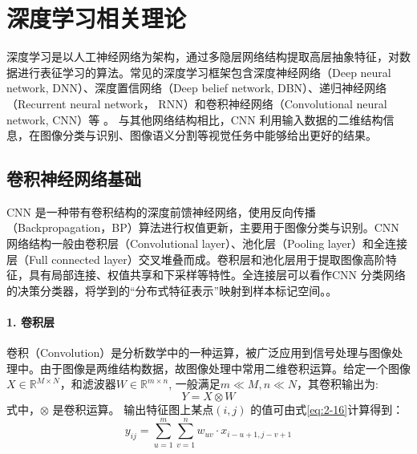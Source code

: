 
\chapter{深度学习相关理论}
\label{cha:chap02}
深度学习是以人工神经网络为架构，通过多隐层网络结构提取高层抽象特征，对数据进行表征学习的算法。常见的深度学习框架包含深度神经网络（Deep neural network, DNN）、深度置信网络（Deep belief network, DBN）、递归神经网络（Recurrent neural network， RNN）和卷积神经网络（Convolutional neural network, CNN）等\cite{krizhevsky2012imagenet} 。 与其他网络结构相比，CNN 利用输入数据的二维结构信息，在图像分类与识别、图像语义分割等视觉任务中能够给出更好的结果。

\section{卷积神经网络基础}
\label{sec:chap02-1}

CNN 是一种带有卷积结构的深度前馈神经网络，使用反向传播（Backpropagation，BP）算法进行权值更新，主要用于图像分类与识别。CNN 网络结构一般由卷积层（Convolutional layer）、池化层（Pooling layer）和全连接层（Full connected layer）交叉堆叠而成。卷积层和池化层用于提取图像高阶特征，具有局部连接、权值共享和下采样等特性。全连接层可以看作CNN 分类网络的决策分类器，将学到的“分布式特征表示”映射到样本标记空间。。

\subsubsection*{1. 卷积层}
\label{subsec:chap02-2-1-1}
卷积（Convolution）是分析数学中的一种运算，被广泛应用到信号处理与图像处理中。由于图像是两维结构数据，故图像处理中常用二维卷积运算。给定一个图像$X \in \mathbb{R}^{M \times N}$，和滤波器$W \in \mathbb{R}^{m \times n}$, 一般满足$m \ll M, n \ll N$，其卷积输出为:
\begin{equation}
  \label{eq:2-15}
  Y = X \otimes W
\end{equation}
式中，$\otimes$ 是卷积运算。 输出特征图上某点$(i,j)$ 的值可由式\ref{eq:2-16}计算得到：
\begin{equation}
  \label{eq:2-16}
  y_{ij} = \sum_{u=1}^m\sum_{v=1}^n w_{uv}\cdot x_{i-u+1,j-v+1}
\end{equation}

